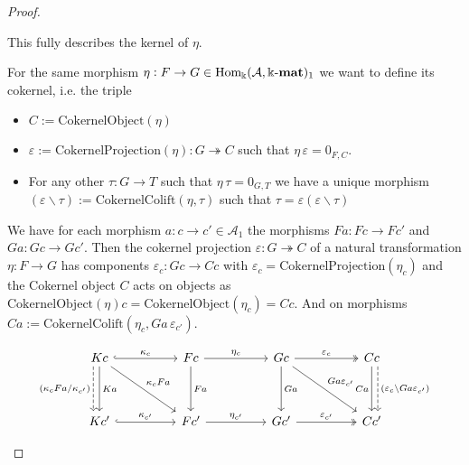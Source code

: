 \begin{proof}
\begin{enumerate}
\begin{subproof}[Proof of (ii)]
This fully describes the kernel of $\eta$.
\end{subproof}
\begin{subproof}
For the same morphism $\eta : F \rightarrow G \in \mathrm{Hom_{\Bbbk}}(\mathcal{A},\Bbbk\textnormal{-}\mathbf{mat})_{1}$  we want to define its cokernel, i.e. the triple
\begin{itemize}
\item $C := \mathrm{CokernelObject}(\eta)$
\item $\varepsilon := \mathrm{CokernelProjection}(\eta) : G \twoheadrightarrow C$ such that $\eta\,\varepsilon = 0_{F,C}$.
\item For any other $\tau : G \rightarrow T$ such that $\eta\,\tau = 0_{G,T}$ we have a unique morphism
$(\varepsilon \backslash \tau) := \mathrm{CokernelColift}(\eta,\tau)$ such that $\tau = \varepsilon (\varepsilon \backslash \tau)$
\end{itemize}
We have for each morphism $a : c \rightarrow c' \in \mathcal{A}_{1}$ the morphisms $Fa : Fc \rightarrow Fc'$ and
$Ga : Gc \rightarrow Gc'$. Then the cokernel projection $\varepsilon : G \twoheadrightarrow C$ of a natural transformation
$\eta : F \rightarrow G$ has components
$\varepsilon_{c} : Gc \rightarrow Cc$ with $\varepsilon_{c} = \mathrm{CokernelProjection}(\eta_{c})$ and the Cokernel object $C$ acts on
objects as $\mathrm{CokernelObject}(\eta)c = \mathrm{CokernelObject}(\eta_{c}) = Cc$.
And on morphisms $Ca := \mathrm{CokernelColift}(\eta_{c},Ga\,\varepsilon_{c'})$.

\[
\begin{tikzcd}
Kc \arrow[dd, "Ka"] \arrow[rr, "\kappa_{c}", hook] \arrow[rrdd, "\kappa_{c}Fa"] \arrow[dd, "(\kappa_{c}Fa/\kappa_{c'})"', dashed, shift right=2] &  & Fc \arrow[rr, "\eta_{c}"] \arrow[dd, "Fa"] &  & Gc \arrow[dd, "Ga"] \arrow[rr, "\varepsilon_{c}", two heads] \arrow[rrdd, "Ga\varepsilon_{c'}"] &  & Cc \arrow[dd, "Ca"'] \arrow[dd, "(\varepsilon_{c}\backslash Ga\varepsilon_{c'})", dashed, shift left=2] \\
                                                                                                                                                                                                       &  &                                            &  &                                                                                                                                                             &  &                                                                                                  \\
Kc' \arrow[rr, "\kappa_{c'}", hook]                                                                                                                                                                    &  & Fc' \arrow[rr, "\eta_{c'}"]                &  & Gc' \arrow[rr, "\varepsilon_{c'}", two heads]                                                                                                               &  & Cc'                                                                                             
\end{tikzcd}
\]


\end{subproof}
\end{enumerate}
\end{proof}

